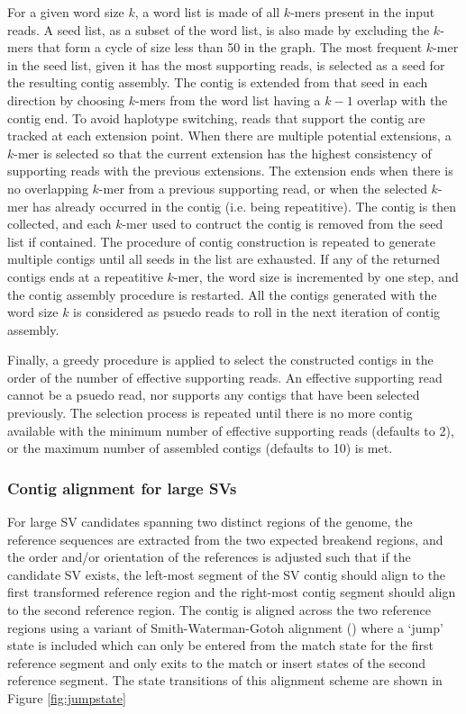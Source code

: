 \documentclass{article}
\begin{document}
For a given word size $k$, a word list is made of all $k$-mers present in the input reads. A seed list, as a subset of the word list, is also made by excluding the $k$-mers that form a cycle of size less than 50 in the graph. The most frequent $k$-mer in the seed list, given it has the most supporting reads, is selected as a seed for the resulting contig assembly. The contig is extended from that seed in each direction by choosing $k$-mers from the word list having a $k-1$ overlap with the contig end. To avoid haplotype switching, reads that support the contig are tracked at each extension point. When there are multiple potential extensions, a $k$-mer is selected so that the current extension has the highest consistency of supporting reads with the previous extensions. The extension ends when there is no overlapping $k$-mer from a previous supporting read, or when the selected $k$-mer has already occurred in the contig (i.e. being repeatitive). The contig is then collected, and each $k$-mer used to contruct the contig is removed from the seed list if contained. The procedure of contig construction is repeated to generate multiple contigs until all seeds in the list are exhausted. If any of the returned contigs ends at a repeatitive $k$-mer, the word size is incremented by one step, and the contig assembly procedure is restarted. All the contigs generated with the word size $k$ is considered as psuedo reads to roll in the next iteration of contig assembly.

Finally, a greedy procedure is applied to select the constructed contigs in the order of the number of effective supporting reads. An effective supporting read cannot be a psuedo read, nor supports any contigs that have been selected previously. The selection process is repeated until there is no more contig available with the minimum number of effective supporting reads (defaults to 2), or the maximum number of assembled contigs (defaults to 10) is met. 

\subsubsection{Contig alignment for large SVs} For large SV candidates spanning two distinct regions of the genome, the reference sequences are extracted from the two expected breakend regions, and the order and/or orientation of the references is adjusted such that if the candidate SV exists, the left-most segment of the SV contig should align to the first transformed reference region and the right-most contig segment should align to the second reference region. The contig is aligned across the two reference regions using a variant of Smith-Waterman-Gotoh alignment (\cite{smith1981,gotoh1982}) where a `jump' state is included which can only be entered from the match state for the first reference segment and only exits to the match or insert states of the second reference segment. The state transitions of this alignment scheme are shown in Figure \ref{fig:jumpstate}
\end{document}
